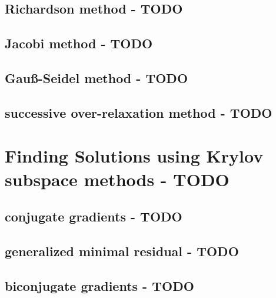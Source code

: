 \subsection{Richardson method - TODO}


\subsection{Jacobi method - TODO}


\subsection{Gauß-Seidel method - TODO}


\subsection{successive over-relaxation method - TODO}


\section{Finding Solutions using Krylov subspace methods - TODO}


\subsection{conjugate gradients - TODO}


\subsection{generalized minimal residual - TODO}


\subsection{biconjugate gradients - TODO}
















